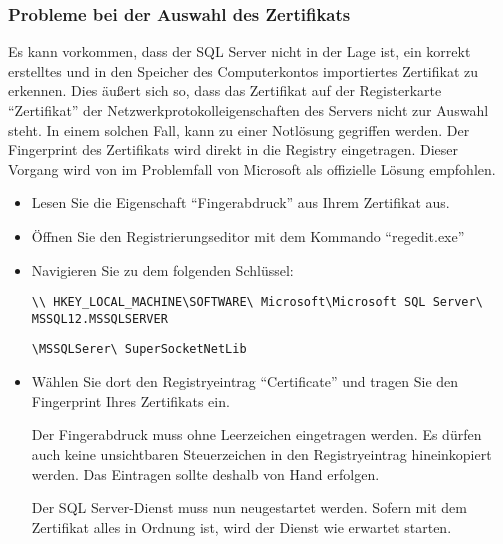       \subsubsection{Probleme bei der Auswahl des Zertifikats}
        Es kann vorkommen, dass der SQL Server nicht in der Lage ist, ein
        korrekt erstelltes und in den Speicher des Computerkontos
        importiertes Zertifikat zu erkennen. Dies äußert sich so, dass das
        Zertifikat auf der Registerkarte \enquote{Zertifikat} der
        Netzwerkprotokolleigenschaften des Servers nicht zur Auswahl steht.
        In einem solchen Fall, kann zu einer Notlösung gegriffen werden. Der
        Fingerprint des Zertifikats wird direkt in die Registry eingetragen.
        Dieser Vorgang wird von im Problemfall von Microsoft als offizielle
        Lösung empfohlen.
        \begin{itemize}
            \item Lesen Sie die Eigenschaft \enquote{Fingerabdruck} aus Ihrem
            Zertifikat aus.
            \item Öffnen Sie den Registrierungseditor mit dem Kommando
            \enquote{regedit.exe}
            \item Navigieren Sie zu dem folgenden Schlüssel:
            
            \begin{small}
            \texttt{\textbackslash\textbackslash
            HKEY\_LOCAL\_MACHINE\textbackslash SOFTWARE\textbackslash
            Microsoft\textbackslash Microsoft SQL Server\textbackslash
            MSSQL12.MSSQLSERVER}
            
            \texttt{\textbackslash MSSQLSerer\textbackslash
            SuperSocketNetLib}
            \end{small}
            \item Wählen Sie dort den Registryeintrag \enquote{Certificate} und
            tragen Sie den Fingerprint Ihres Zertifikats ein.
            \begin{merke}
              Der Fingerabdruck muss ohne Leerzeichen eingetragen werden. Es
              dürfen auch keine unsichtbaren Steuerzeichen in den
              Registryeintrag hineinkopiert werden. Das Eintragen sollte deshalb
              von Hand erfolgen.
            \end{merke}
            Der SQL Server-Dienst muss nun neugestartet werden. Sofern mit dem
            Zertifikat alles in Ordnung ist, wird der Dienst wie erwartet
            starten.
        \end{itemize}
